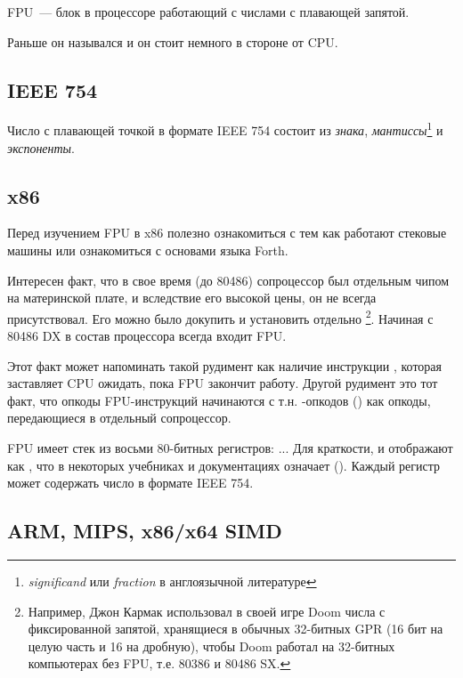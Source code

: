 \mysection{\FPUChapterName}
\label{sec:FPU}

\ac{FPU}~--- блок в процессоре работающий с числами с плавающей запятой.

Раньше он назывался  и он стоит немного в стороне от \ac{CPU}.

\subsection{IEEE 754}

Число с плавающей точкой в формате IEEE 754 состоит из \emph{знака}, \emph{мантиссы}\footnote{\emph{significand} или \emph{fraction} 
в англоязычной литературе} и \emph{экспоненты}.

\subsection{x86}

Перед изучением \ac{FPU} в x86 полезно ознакомиться с тем как работают стековые машины
или ознакомиться с основами языка Forth.

Интересен факт, что в свое время (до 80486) сопроцессор был отдельным чипом на материнской плате, 
и вследствие его высокой цены, он не всегда присутствовал. Его можно было докупить и установить отдельно
\footnote{Например, Джон Кармак использовал в своей игре Doom числа с фиксированной запятой, хранящиеся
в обычных 32-битных \ac{GPR} (16 бит на целую часть и 16 на дробную),
чтобы Doom работал на 32-битных компьютерах без FPU, т.е. 80386 и 80486 SX.}.
Начиная с 80486 DX в состав процессора всегда входит FPU.

Этот факт может напоминать такой рудимент как наличие инструкции , которая заставляет
\ac{CPU} ожидать, пока \ac{FPU} закончит работу.
Другой рудимент это тот факт, что опкоды \ac{FPU}-инструкций начинаются с т.н. -опкодов 
() как опкоды, передающиеся в отдельный сопроцессор.

\label{FPU_is_stack}
FPU имеет стек из восьми 80-битных регистров: ...
Для краткости, \IDA и \olly отображают  как ,
что в некоторых учебниках и документациях означает  ().
Каждый регистр может содержать число в формате IEEE 754.

\subsection{ARM, MIPS, x86/x64 SIMD}

